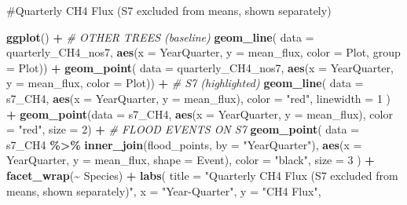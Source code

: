 \documentclass[
]{article}
\newenvironment{Shaded}{\begin{snugshade}}{\end{snugshade}}
\newcommand{\AttributeTok}[1]{\textcolor[rgb]{0.13,0.29,0.53}{#1}}
\newcommand{\CommentTok}[1]{\textcolor[rgb]{0.56,0.35,0.01}{\textit{#1}}}
\newcommand{\DecValTok}[1]{\textcolor[rgb]{0.00,0.00,0.81}{#1}}
\newcommand{\FunctionTok}[1]{\textcolor[rgb]{0.13,0.29,0.53}{\textbf{#1}}}
\newcommand{\NormalTok}[1]{#1}
\newcommand{\SpecialCharTok}[1]{\textcolor[rgb]{0.81,0.36,0.00}{\textbf{#1}}}
\newcommand{\StringTok}[1]{\textcolor[rgb]{0.31,0.60,0.02}{#1}}
\begin{document}
\#Quarterly CH4 Flux (S7 excluded from means, shown separately)

\begin{Shaded}
\begin{Highlighting}[]
\FunctionTok{ggplot}\NormalTok{() }\SpecialCharTok{+}
  \CommentTok{\# OTHER TREES (baseline)}
  \FunctionTok{geom\_line}\NormalTok{(}
    \AttributeTok{data =}\NormalTok{ quarterly\_CH4\_nos7,}
    \FunctionTok{aes}\NormalTok{(}\AttributeTok{x =}\NormalTok{ YearQuarter, }\AttributeTok{y =}\NormalTok{ mean\_flux, }\AttributeTok{color =}\NormalTok{ Plot, }\AttributeTok{group =}\NormalTok{ Plot)) }\SpecialCharTok{+}
  \FunctionTok{geom\_point}\NormalTok{(}
    \AttributeTok{data =}\NormalTok{ quarterly\_CH4\_nos7,}
    \FunctionTok{aes}\NormalTok{(}\AttributeTok{x =}\NormalTok{ YearQuarter, }\AttributeTok{y =}\NormalTok{ mean\_flux, }\AttributeTok{color =}\NormalTok{ Plot)) }\SpecialCharTok{+}
  \CommentTok{\# S7 (highlighted)}
  \FunctionTok{geom\_line}\NormalTok{(}
    \AttributeTok{data =}\NormalTok{ s7\_CH4,}
    \FunctionTok{aes}\NormalTok{(}\AttributeTok{x =}\NormalTok{ YearQuarter, }\AttributeTok{y =}\NormalTok{ mean\_flux),}
    \AttributeTok{color =} \StringTok{"red"}\NormalTok{,}
    \AttributeTok{linewidth =} \DecValTok{1}\NormalTok{ ) }\SpecialCharTok{+}
  \FunctionTok{geom\_point}\NormalTok{(}\AttributeTok{data =}\NormalTok{ s7\_CH4,}
             \FunctionTok{aes}\NormalTok{(}\AttributeTok{x =}\NormalTok{ YearQuarter, }\AttributeTok{y =}\NormalTok{ mean\_flux),}
             \AttributeTok{color =} \StringTok{"red"}\NormalTok{, }\AttributeTok{size =} \DecValTok{2}\NormalTok{) }\SpecialCharTok{+}
  \CommentTok{\# FLOOD EVENTS ON S7 }
  \FunctionTok{geom\_point}\NormalTok{(}
    \AttributeTok{data =}\NormalTok{ s7\_CH4 }\SpecialCharTok{\%\textgreater{}\%}
      \FunctionTok{inner\_join}\NormalTok{(flood\_points, }\AttributeTok{by =} \StringTok{"YearQuarter"}\NormalTok{),}
    \FunctionTok{aes}\NormalTok{(}\AttributeTok{x =}\NormalTok{ YearQuarter, }\AttributeTok{y =}\NormalTok{ mean\_flux, }\AttributeTok{shape =}\NormalTok{ Event),}
    \AttributeTok{color =} \StringTok{"black"}\NormalTok{,}
    \AttributeTok{size =} \DecValTok{3}\NormalTok{ ) }\SpecialCharTok{+}
  \FunctionTok{facet\_wrap}\NormalTok{(}\SpecialCharTok{\textasciitilde{}}\NormalTok{ Species) }\SpecialCharTok{+}
  \FunctionTok{labs}\NormalTok{( }\AttributeTok{title =} \StringTok{"Quarterly CH4 Flux (S7 excluded from means, shown separately)"}\NormalTok{,}
        \AttributeTok{x =} \StringTok{"Year{-}Quarter"}\NormalTok{,}
        \AttributeTok{y =} \StringTok{"CH4 Flux"}\NormalTok{,}

\end{Highlighting}
\end{Shaded}
\end{document}

